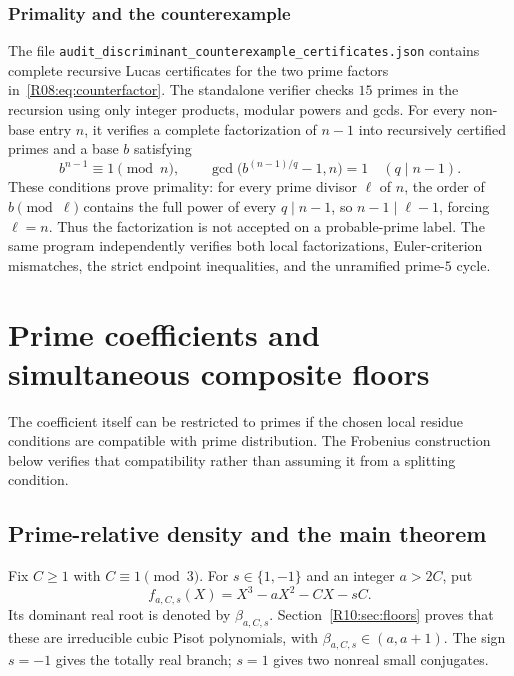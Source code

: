 \documentclass[11pt,a4paper]{article}
\theoremstyle{definition}\newtheorem{definition}[theorem]{Definition}
\theoremstyle{remark}\newtheorem{remark}[theorem]{Remark}
\begin{document}
\subsubsection{Primality and the counterexample}
The file \texttt{audit\_discriminant\_counterexample\_certificates.json}
contains complete recursive Lucas certificates for the two prime factors
in~\eqref{R08:eq:counterfactor}. The standalone verifier checks $15$ primes
in the recursion using only integer products, modular powers and gcds.
For every non-base entry $n$, it verifies a complete factorization of
$n-1$ into recursively certified primes and a base $b$ satisfying
\[
 b^{n-1}\equiv1\pmod n,\qquad
 \gcd\bigl(b^{(n-1)/q}-1,n\bigr)=1\quad(q\mid n-1).
\]
These conditions prove primality: for every prime divisor $\ell$ of $n$,
the order of $b\pmod\ell$ contains the full power of every $q\mid n-1$,
so $n-1\mid\ell-1$, forcing $\ell=n$.
Thus the factorization is not accepted on a probable-prime label.
The same program independently verifies both local factorizations,
Euler-criterion mismatches, the strict endpoint inequalities, and the
unramified prime-$5$ cycle.



\endgroup

\section{Prime coefficients and simultaneous composite floors}\label{src:R10}
The coefficient itself can be restricted to primes if the chosen local residue conditions are compatible with prime distribution. The Frobenius construction below verifies that compatibility rather than assuming it from a splitting condition.
\medskip
\begingroup




\subsection{Prime-relative density and the main theorem}

Fix $C\ge1$ with $C\equiv1\pmod3$.
For $s\in\{1,-1\}$ and an integer $a>2C$, put
\begin{equation}\label{R10:eq:family}
             f_{a,C,s}(X)=X^3-aX^2-CX-sC.
\end{equation}
Its dominant real root is denoted by $\beta_{a,C,s}$.
Section~\ref{R10:sec:floors} proves that these are irreducible cubic Pisot
polynomials, with $\beta_{a,C,s}\in(a,a+1)$.
The sign $s=-1$ gives the totally real branch; $s=1$ gives two nonreal
small conjugates.
\end{document}
